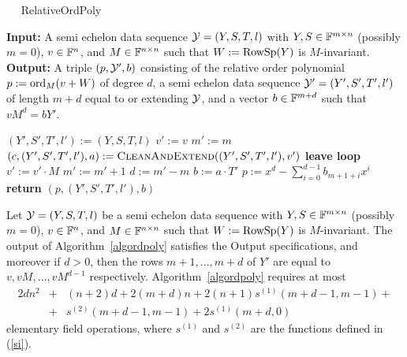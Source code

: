 \begin{algorithm}[t]
\caption{$\quad$ \sc RelativeOrdPoly}
\label{algordpoly}
%
\begin{algorithmic}
\STATE \textbf{Input:} A semi echelon data sequence $\mathcal{Y}=(Y,S,T,l)$ with 
$Y,S \in \mathbb{F}^{m \times n}$ (possibly $m=0$),
$v \in \mathbb{F}^n$, 
and $M \in \mathbb{F}^{n \times n}$ such that $W:=\mathrm{RowSp}(Y)$ is $M$-invariant.
\STATE \textbf{Output:} A triple $(p,\mathcal{Y}',b)$ consisting of the
relative order polynomial $p := \mathrm{ord}_M(v+W)$ of degree $d$,
a semi echelon data sequence $\mathcal{Y}'=(Y',S',T',l')$ of length $m+d$ equal
to or extending $\mathcal{Y}$, and a vector $b \in \mathbb{F}^{m+d}$ such that $vM^d =
bY'$.

\vspace*{2mm}
\STATE $(Y',S',T',l') := (Y,S,T,l)$ \hspace*{2mm}
\STATE $v' := v$
\STATE $m' := m$ \hspace*{3.08cm}  
\LOOP
    \STATE $(c,(Y',S',T',l'),a) := \mbox{\sc CleanAndExtend}((Y',S',T',l'),v')$  
    \STATE \hspace*{5cm} 
        \STATE \textbf{leave loop}
    \ENDIF
    \STATE $v' := v' \cdot M$
     \STATE $m' := m' +1$	
\ENDLOOP \hspace*{1.5cm}  
\STATE $d := m'-m$
\STATE $b := a\cdot T'$
\STATE $p :=x^d-\sum_{i=0}^{d-1} b_{m+1+i} x^i$
\STATE \textbf{return} $(p, (Y',S',T',l'),b)$
\end{algorithmic}
\end{algorithm}

\begin{Prop}
\label{proprelorderpol}
%
Let\/ $\mathcal{Y}=(Y,S,T,l)$ be a semi echelon data sequence 
with $Y,S \in \mathbb{F}^{m \times
n}$ (possibly $m=0$), $v \in \mathbb{F}^n$, and $M \in \mathbb{F}^{n \times n}$
such that $W:=\mathrm{RowSp}(Y)$ is $M$-invariant. 
The output of Algorithm~\ref{algordpoly} satisfies the Output specifications, and
moreover if $d>0$, then
the rows $m+1, \ldots, m+d$ of $Y'$ are equal to $v,vM,\ldots,vM^{d-1}$
respectively.
Algorithm~\ref{algordpoly} requires at most
\begin{eqnarray*}
2dn^2 &+& (n+2)d +2(m+d)n 
+ 2(n+1)s^{(1)}(m+d-1,m-1) +  \\
 &+& s^{(2)}(m+d-1,m-1) 
+ 2s^{(1)}(m+d,0)
\end{eqnarray*}
elementary field operations, where $s^{(1)}$ and $s^{(2)}$ are the
functions defined in (\ref{si}).
\end{Prop}

